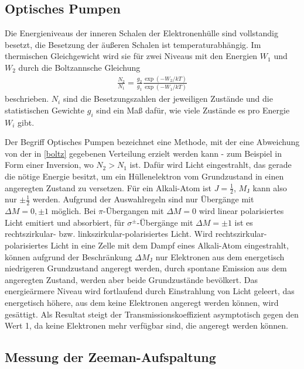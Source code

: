 \subsection{Optisches Pumpen}

Die Energieniveaus der inneren Schalen der Elektronenhülle sind vollstandig besetzt, die Besetzung der äußeren Schalen ist
temperaturabhängig. Im thermischen Gleichgewicht wird sie für zwei Niveaus mit den Energien $W_1$ und $W_2$ durch die
Boltzannsche Gleichung
\begin{align}
  \frac{N_2}{N_1} = \frac{g_2}{g_1}\frac{\exp(-W_2/kT)}{\exp(-W_1/kT)}
  \label{boltz}
\end{align}
beschrieben. $N_i$ sind die Besetzungszahlen der jeweiligen Zustände und die statistischen Gewichte $g_i$ sind ein Maß
dafür, wie viele Zustände es pro Energie $W_i$ gibt.

Der Begriff Optisches Pumpen bezeichnet eine Methode, mit der eine Abweichung von der in \autoref{boltz} gegebenen
Verteilung erzielt werden kann - zum Beispiel in Form einer Inversion, wo $N_2 > N_1$ ist.
Dafür wird Licht eingestrahlt, das gerade die nötige Energie besitzt, um ein Hüllenelektron vom Grundzustand in einen
angeregten Zustand zu versetzen. Für ein Alkali-Atom ist $J=\frac{1}{2}$, $M_\text{J}$ kann also nur $\pm \frac{1}{2}$
werden. Aufgrund der Auswahlregeln sind nur Übergänge mit $\Delta M = 0,\pm 1$ möglich.
Bei $\pi$-Übergangen mit $\Delta M = 0$ wird linear polarisiertes Licht emitiert und absorbiert, für $\sigma^\pm$-Übergänge
mit $\Delta M = \pm 1$ ist es rechtszirkular- bzw. linkszirkular-polarisiertes Licht.
Wird rechtszirkular-polarisiertes Licht in eine Zelle mit dem Dampf eines Alkali-Atom eingestrahlt, können aufgrund der
Beschränkung $\Delta M_\text{J}$ nur Elektronen aus dem energetisch niedrigeren Grundzustand angeregt werden, durch spontane
Emission aus dem angeregten Zustand, werden aber beide Grundzustände bevölkert. Das energieärmere Niveau wird fortlaufend
durch Einstrahlung von Licht geleert, das energetisch höhere, aus dem keine Elektronen angeregt werden können, wird gesättigt.
Als Resultat steigt der Transmissionskoeffizient asymptotisch gegen den Wert 1, da keine Elektronen mehr verfügbar sind, die
angeregt werden können.

\subsection{Messung der Zeeman-Aufspaltung}

